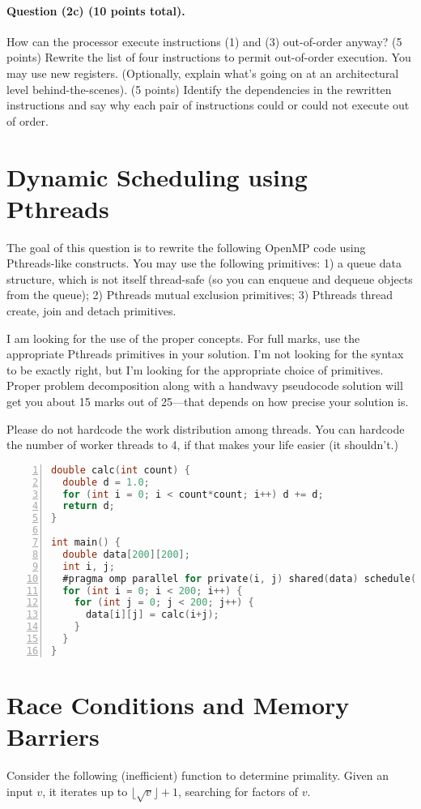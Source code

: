 \documentclass[12pt]{article}
\begin{document}
\paragraph{Question (2c) (10 points total).} How can the processor execute instructions
(1) and (3) out-of-order anyway? (5 points) Rewrite the list of four
instructions to permit out-of-order execution. You may use new
registers. (Optionally, explain what's going on at an architectural
level behind-the-scenes). (5 points) Identify the dependencies in the
rewritten instructions and say why each pair of instructions could or
could not execute out of order.

\newpage
\section{Dynamic Scheduling using Pthreads}
The goal of this question is to rewrite the following OpenMP code
using Pthreads-like constructs. You may use the following primitives: 1) a queue data
structure, which is not itself thread-safe (so you can enqueue and
dequeue objects from the queue); 2) Pthreads mutual exclusion primitives;
3) Pthreads thread create, join and detach primitives.

I am looking for the use of the proper concepts. For full marks, use
the appropriate Pthreads primitives in your solution. I'm not looking
for the syntax to be exactly right, but I'm looking for the
appropriate choice of primitives. Proper problem decomposition along
with a handwavy pseudocode solution will get you about 15 marks out of
25---that depends on how precise your solution is.

Please do not hardcode the work distribution among threads. You can
hardcode the number of worker threads to 4, if that makes your life
easier (it shouldn't.)
\begin{lstlisting}[numbers=left,language=C,basicstyle=\scriptsize]
double calc(int count) {
  double d = 1.0;
  for (int i = 0; i < count*count; i++) d += d;
  return d;
}

int main() {
  double data[200][200];
  int i, j;
  #pragma omp parallel for private(i, j) shared(data) schedule(dynamic, 50)
  for (int i = 0; i < 200; i++) {
    for (int j = 0; j < 200; j++) {
      data[i][j] = calc(i+j);
    }
  }
}
\end{lstlisting}

\newpage
\section{Race Conditions and Memory Barriers}
Consider the following (inefficient) function to determine primality.
Given an input $v$, it iterates up to $\lfloor \sqrt{v} \rfloor + 1$,
searching for factors of $v$. 
\end{document}

